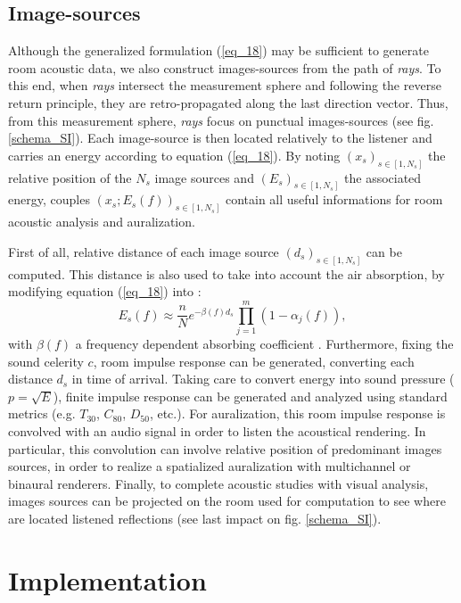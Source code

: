 \documentclass[AMA,STIX1COL]{WileyNJD-v2}
\begin{document}
\subsection{Image-sources}
\label{is}
Although the generalized formulation (\ref{eq_18}) may be sufficient to generate room acoustic data, we also construct images-sources from the path of \textit{rays}. To this end, when \textit{rays} intersect the measurement sphere and following the reverse return principle, they are retro-propagated along the last direction vector. Thus, from this measurement sphere, \textit{rays} focus on punctual images-sources (see fig. \ref{schema_SI}). Each image-source is then located relatively to the listener and carries an energy according to equation (\ref{eq_18}). By noting $(x_s)_{s \in [1, N_s]}$ the relative position of the $N_s$ image sources and $(E_s)_{s \in [1, N_s]}$ the associated energy, couples $(x_s;E_s(f))_{s \in [1, N_s]}$ contain all useful informations for room acoustic analysis and auralization. 

First of all, relative distance of each image source $(d_s)_{s \in [1, N_s]}$ can be computed. This distance is also used to take into account the air absorption, by modifying equation (\ref{eq_18}) into :
\begin{equation}
E_s(f) \approx  \frac{n}{N}  e^{-\beta(f) d_s}  \prod_{j=1}^{m}(1 - \alpha_j(f)),
\label{eq_19}
\end{equation}    
with $\beta(f)$ a frequency dependent absorbing coefficient \cite{iso}. Furthermore, fixing the sound celerity $c$, room impulse response can be generated, converting each distance $d_s$ in time of arrival. Taking care to convert energy into sound pressure ($p = \sqrt{E}$), finite impulse response can be generated and analyzed using standard metrics (e.g. $T_{30}$, $C_{80}$, $D_{50}$, etc.). For auralization, this room impulse response is convolved with an audio signal in order to listen the acoustical rendering. In particular, this convolution can involve relative position of predominant images sources, in order to realize a spatialized auralization with multichannel or binaural renderers. Finally, to complete acoustic studies with visual analysis, images sources can be projected on the room used for computation to see where are located listened reflections (see last impact on fig. \ref{schema_SI}).



\section{Implementation}
\end{document}
